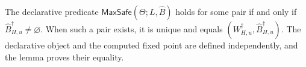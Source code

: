 \begin{lemma}
\label{lem:app-spec-bridge}
The declarative predicate \(\mathsf{MaxSafe}(\Theta;L,\widehat B)\) holds for some pair if and only if \(\widehat B^\dagger_{H,u}\ne\varnothing\).
When such a pair exists, it is unique and equals \((W^\dagger_{H,u},\widehat B^\dagger_{H,u})\).
The declarative object and the computed fixed point are defined independently, and the lemma proves their equality.
\end{lemma}


